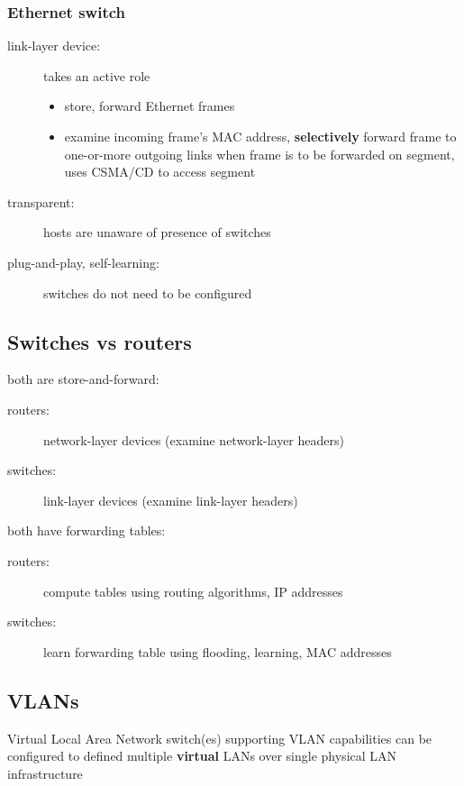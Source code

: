 \subsubsection{Ethernet switch}
\begin{description}
	\item[link-layer device:] takes an active role
	\begin{itemize}
		\item store, forward Ethernet frames
		\item examine incoming frame's MAC address, \textbf{selectively} forward frame to one-or-more outgoing links when frame is to be forwarded on segment, uses CSMA/CD to access segment
	\end{itemize}
	\item[transparent:] hosts are unaware of presence of switches
	\item[plug-and-play, self-learning:] switches do not need to be configured
\end{description}

\subsection{Switches vs routers}
both are store-and-forward:
\begin{description}
	\item[routers:] network-layer devices (examine network-layer headers)
	\item[switches:] link-layer devices (examine link-layer headers)
\end{description}
both have forwarding tables:
\begin{description}
	\item[routers:] compute tables using routing algorithms, IP addresses
	\item[switches:] learn forwarding table using flooding, learning, MAC addresses
\end{description}

\subsection{VLANs}
\begin{note}{Virtual Local Area Network}
	switch(es) supporting VLAN capabilities can be configured to defined multiple \textbf{virtual} LANs over single physical LAN infrastructure
\end{note}
